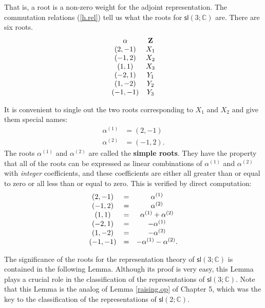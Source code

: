 \documentclass{amsbook}
\theoremstyle{plain}
\numberwithin{equation}{chapter}
\numberwithin{theorem}{chapter}
\begin{document}
That is, a root is a non-zero weight for the adjoint representation. The
commutation relations (\ref{h.rel}) tell us what the roots for $\mathsf{sl}%
\left(  3;\mathbb{C}\right)  $ are. There are six roots.
\begin{equation}%
\begin{array}
[c]{cc}%
\mathbf{\alpha} & \mathbf{Z}\\
\left(  2,-1\right)  & X_{1}\\
(-1,2) & X_{2}\\
(1,1) & X_{3}\\
(-2,1) & Y_{1}\\
(1,-2) & Y_{2}\\
(-1,-1) & Y_{3}%
\end{array}
\label{the.roots}%
\end{equation}

It is convenient to single out the two roots corresponding to $X_{1}$ and
$X_{2}$ and give them special names:
\begin{align}
\alpha^{(1)}  & =\left(  2,-1\right) \nonumber\\
\alpha^{(2)}  & =(-1,2)\text{.}\label{simple.roots}%
\end{align}
The roots $\alpha^{(1)}$ and $\alpha^{(2)}$ are called the \textbf{simple
roots}. They have the property that all of the roots can be expressed as
linear combinations of $\alpha^{(1)}$ and $\alpha^{(2)}$ with \textit{integer}
coefficients, and these coefficients are either all greater than or equal to
zero or all less than or equal to zero. This is verified by direct
computation:
\[%
\begin{array}
[c]{ccc}%
(2,-1) & = & \alpha^{(1)}\\
(-1,2) & = & \alpha^{(2)}\\
(1,1) & = & \alpha^{(1)}+\alpha^{(2)}\\
(-2,1) & = & -\alpha^{(1)}\\
(1,-2) & = & -\alpha^{(2)}\\
(-1,-1) & = & -\alpha^{(1)}-\alpha^{(2)}\text{.}%
\end{array}
\]

The significance of the roots for the representation theory of $\mathsf{sl}%
\left(  3;\mathbb{C}\right)  $ is contained in the following Lemma. Although
its proof is very easy, this Lemma plays a crucial role in the classification
of the representations of $\mathsf{sl}\left(  3;\mathbb{C}\right)  $. Note
that this Lemma is the analog of Lemma \ref{raising.op} of Chapter 5, which
was the key to the classification of the representations of $\mathsf{sl}%
(2;\mathbb{C})$.
\end{document}
